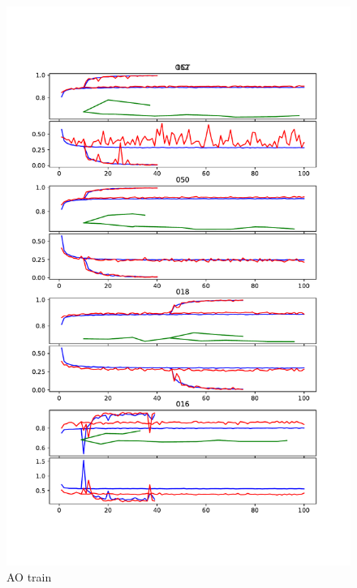 \documentclass{article}
\begin{document}
	\begin{figure}[htbp]
		\centering
		\includegraphics[width=\linewidth]{Figs/abnormity_OCT_loss_and_acc.pdf}
		\caption{AO train}
		\vspace{0.3cm}
		\label{fig:AO_train}
	\end{figure}
	
\end{document}
